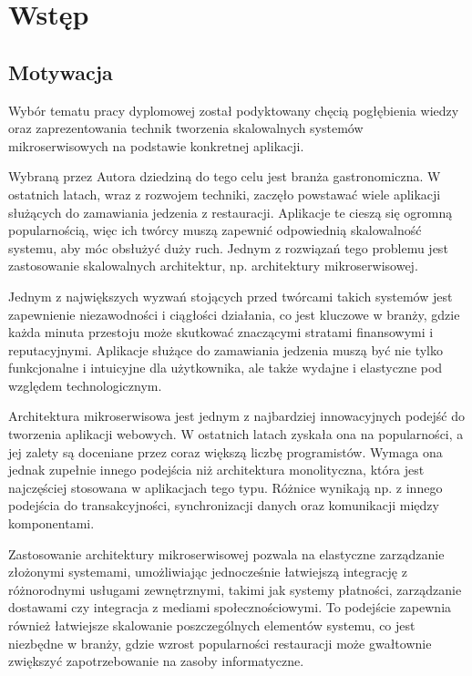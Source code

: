 \clearpage %
\section{Wstęp}

\subsection{Motywacja}

Wybór tematu pracy dyplomowej został podyktowany chęcią pogłębienia wiedzy oraz zaprezentowania technik tworzenia skalowalnych systemów mikroserwisowych na podstawie konkretnej aplikacji.

Wybraną przez Autora dziedziną do tego celu jest branża gastronomiczna. W ostatnich latach, wraz z rozwojem techniki, zaczęło powstawać wiele aplikacji służących do zamawiania jedzenia z restauracji. Aplikacje te cieszą się ogromną popularnością, więc ich twórcy muszą zapewnić odpowiednią skalowalność systemu, aby móc obsłużyć duży ruch. Jednym z rozwiązań tego problemu jest zastosowanie skalowalnych architektur, np. architektury mikroserwisowej.

Jednym z największych wyzwań stojących przed twórcami takich systemów jest zapewnienie niezawodności i ciągłości działania, co jest kluczowe w branży, gdzie każda minuta przestoju może skutkować znaczącymi stratami finansowymi i reputacyjnymi. Aplikacje służące do zamawiania jedzenia muszą być nie tylko funkcjonalne i intuicyjne dla użytkownika, ale także wydajne i elastyczne pod względem technologicznym.

Architektura mikroserwisowa jest jednym z najbardziej innowacyjnych podejść do tworzenia aplikacji webowych. W ostatnich latach zyskała ona na popularności, a jej zalety są doceniane przez coraz większą liczbę programistów. Wymaga ona jednak zupełnie innego podejścia niż architektura monolityczna, która jest najczęściej stosowana w aplikacjach tego typu. Różnice wynikają np. z innego podejścia do transakcyjności, synchronizacji danych oraz komunikacji między komponentami.

Zastosowanie architektury mikroserwisowej pozwala na elastyczne zarządzanie złożonymi systemami, umożliwiając jednocześnie łatwiejszą integrację z różnorodnymi usługami zewnętrznymi, takimi jak systemy płatności, zarządzanie dostawami czy integracja z mediami społecznościowymi. To podejście zapewnia również łatwiejsze skalowanie poszczególnych elementów systemu, co jest niezbędne w branży, gdzie wzrost popularności restauracji może gwałtownie zwiększyć zapotrzebowanie na zasoby informatyczne.

